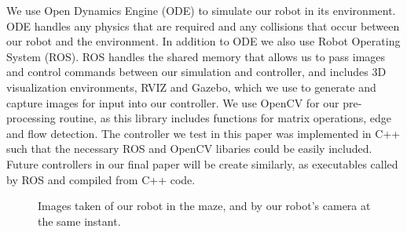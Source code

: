 \documentclass{article}
\begin{document}
		We use Open Dynamics Engine (ODE) to simulate our robot in its environment.  ODE handles any physics that are required and any collisions that occur between our robot and the environment.  In addition to ODE we also use Robot Operating System (ROS).  ROS handles the shared memory that allows us to pass images and control commands between our simulation and controller, and includes 3D visualization environments, RVIZ and Gazebo, which we use to generate and capture images for input into our controller.  We use OpenCV for our pre-processing routine, as this library includes functions for matrix operations, edge and flow detection.  The controller we test in this paper was implemented in C++ such that the necessary ROS and OpenCV libaries could be easily included.  Future controllers in our final paper will be create similarly, as executables called by ROS and compiled from C++ code.

			\begin{figure}[tight]
				\caption{Images taken of our robot in the maze, and by our robot's camera at the same instant.}
			\end{figure}
\end{document}
